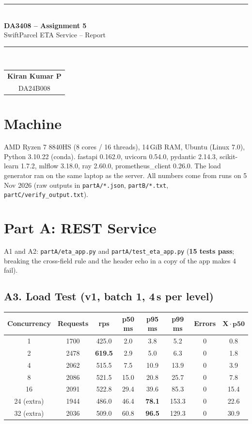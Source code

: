 \documentclass[10pt]{article}
\newcommand{\code}[1]{\texttt{#1}}
\begin{document}
\sloppy

\begin{center}
  \rule{\linewidth}{0.6pt}\\[4pt]
  {\Large\bfseries DA3408 -- Assignment 5}\\[2pt]
  {\large SwiftParcel ETA Service -- Report}\\[2pt]
  \rule{\linewidth}{0.6pt}\\[6pt]
  \begin{tabular}{c}
    \textbf{Kiran Kumar P}\\
    DA24B008
  \end{tabular}
\end{center}

\section{Machine}
AMD Ryzen 7 8840HS (8 cores / 16 threads), 14\,GiB RAM, Ubuntu (Linux 7.0), Python 3.10.22 (conda).
fastapi 0.162.0, uvicorn 0.54.0, pydantic 2.14.3, scikit-learn 1.7.2, mlflow 3.18.0, ray 2.60.0, prometheus\_client 0.26.0.
The load generator ran on the same laptop as the server. All numbers come from runs on 5 Nov 2026 (raw outputs in
\code{partA/*.json}, \code{partB/*.txt}, \code{partC/verify\_output.txt}).

\section{Part A: REST Service}

A1 and A2: \code{partA/eta\_app.py} and \code{partA/test\_eta\_app.py} (\textbf{15 tests pass}; breaking the
cross-field rule and the header echo in a copy of the app makes 4 fail).

\subsection{A3. Load Test (v1, batch 1, 4\,s per level)}

\begin{center}
\begin{tabular}{|c|c|c|c|c|c|c|c|}
\hline
\textbf{Concurrency} & \textbf{Requests} & \textbf{rps} & \textbf{p50 ms} & \textbf{p95 ms} & \textbf{p99 ms} & \textbf{Errors} & $\mathbf{X\cdot p50}$ \\ \hline
1  & 1700 & 425.0 & 2.0  & 3.8  & 5.2   & 0 & 0.8 \\
2  & 2478 & \textbf{619.5} & 2.9 & 5.0 & 6.3 & 0 & 1.8 \\
4  & 2062 & 515.5 & 7.5  & 10.9 & 13.9  & 0 & 3.9 \\
8  & 2086 & 521.5 & 15.0 & 20.8 & 25.7  & 0 & 7.8 \\
16 & 2091 & 522.8 & 29.4 & 39.6 & 85.3  & 0 & 15.4 \\
24 (extra) & 1944 & 486.0 & 46.4 & \textbf{78.1} & 153.3 & 0 & 22.6 \\
32 (extra) & 2036 & 509.0 & 60.8 & \textbf{96.5} & 129.3 & 0 & 30.9 \\ \hline
\end{tabular}
\end{center}
\end{document}

